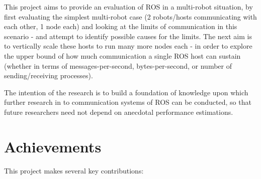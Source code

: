 \documentclass[../dissertation.tex]{subfiles}
\begin{document}
This project aims to provide an evaluation of ROS in a multi-robot situation, by first evaluating the simplest multi-robot case (2 robots/hosts communicating with each other, 1 node each) and looking at the limits of communication in this scenario - and attempt to identify possible causes for the limits. The next aim is to vertically scale these hosts to run many more nodes each - in order to explore the upper bound of how much communication a single ROS host can sustain (whether in terms of messages-per-second, bytes-per-second, or number of sending/receiving processes).

The intention of the research is to build a foundation of knowledge upon which further research in to communication systems of ROS can be conducted, so that future researchers need not depend on anecdotal performance estimations.

\section{Achievements}

This project makes several key contributions:
\end{document}
